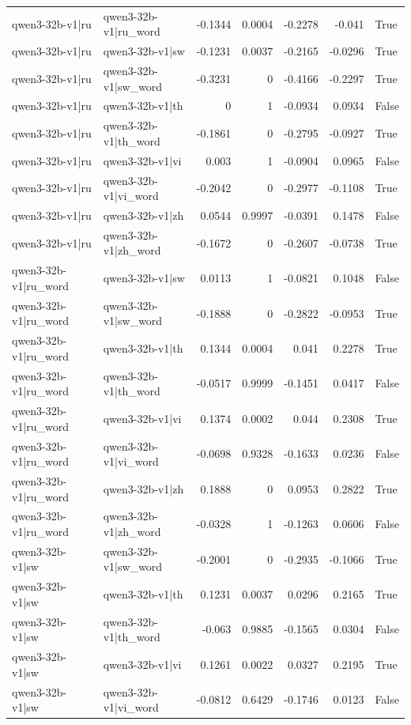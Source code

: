 \begin{table}
\begin{tabular}{l l r r r r l}
qwen3-32b-v1|ru & qwen3-32b-v1|ru_word & -0.1344 & 0.0004 & -0.2278 & -0.041 & True \\
qwen3-32b-v1|ru & qwen3-32b-v1|sw & -0.1231 & 0.0037 & -0.2165 & -0.0296 & True \\
qwen3-32b-v1|ru & qwen3-32b-v1|sw_word & -0.3231 & 0 & -0.4166 & -0.2297 & True \\
qwen3-32b-v1|ru & qwen3-32b-v1|th & 0 & 1 & -0.0934 & 0.0934 & False \\
qwen3-32b-v1|ru & qwen3-32b-v1|th_word & -0.1861 & 0 & -0.2795 & -0.0927 & True \\
qwen3-32b-v1|ru & qwen3-32b-v1|vi & 0.003 & 1 & -0.0904 & 0.0965 & False \\
qwen3-32b-v1|ru & qwen3-32b-v1|vi_word & -0.2042 & 0 & -0.2977 & -0.1108 & True \\
qwen3-32b-v1|ru & qwen3-32b-v1|zh & 0.0544 & 0.9997 & -0.0391 & 0.1478 & False \\
qwen3-32b-v1|ru & qwen3-32b-v1|zh_word & -0.1672 & 0 & -0.2607 & -0.0738 & True \\
qwen3-32b-v1|ru_word & qwen3-32b-v1|sw & 0.0113 & 1 & -0.0821 & 0.1048 & False \\
qwen3-32b-v1|ru_word & qwen3-32b-v1|sw_word & -0.1888 & 0 & -0.2822 & -0.0953 & True \\
qwen3-32b-v1|ru_word & qwen3-32b-v1|th & 0.1344 & 0.0004 & 0.041 & 0.2278 & True \\
qwen3-32b-v1|ru_word & qwen3-32b-v1|th_word & -0.0517 & 0.9999 & -0.1451 & 0.0417 & False \\
qwen3-32b-v1|ru_word & qwen3-32b-v1|vi & 0.1374 & 0.0002 & 0.044 & 0.2308 & True \\
qwen3-32b-v1|ru_word & qwen3-32b-v1|vi_word & -0.0698 & 0.9328 & -0.1633 & 0.0236 & False \\
qwen3-32b-v1|ru_word & qwen3-32b-v1|zh & 0.1888 & 0 & 0.0953 & 0.2822 & True \\
qwen3-32b-v1|ru_word & qwen3-32b-v1|zh_word & -0.0328 & 1 & -0.1263 & 0.0606 & False \\
qwen3-32b-v1|sw & qwen3-32b-v1|sw_word & -0.2001 & 0 & -0.2935 & -0.1066 & True \\
qwen3-32b-v1|sw & qwen3-32b-v1|th & 0.1231 & 0.0037 & 0.0296 & 0.2165 & True \\
qwen3-32b-v1|sw & qwen3-32b-v1|th_word & -0.063 & 0.9885 & -0.1565 & 0.0304 & False \\
qwen3-32b-v1|sw & qwen3-32b-v1|vi & 0.1261 & 0.0022 & 0.0327 & 0.2195 & True \\
qwen3-32b-v1|sw & qwen3-32b-v1|vi_word & -0.0812 & 0.6429 & -0.1746 & 0.0123 & False \\

\end{tabular}
\end{table}
